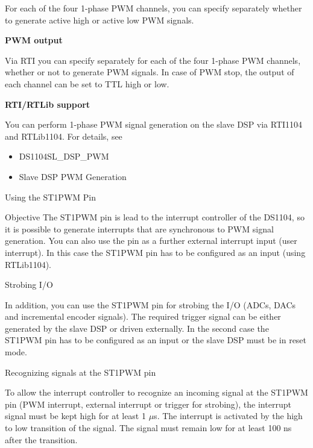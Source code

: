 For each of the four 1-phase PWM channels, you can specify separately whether to generate active high or active low PWM signals.

\noindent \textbf{PWM output}\par
Via RTI you can specify separately for each of the four 1-phase PWM channels, whether or not to generate PWM signals. In case of PWM stop, the output of each channel can be set to TTL high or low.

\noindent \textbf{RTI/RTLib support}\par
You can perform 1-phase PWM signal generation on the slave DSP via RTI1104 and RTLib1104. For details, see
\begin{itemize}
    \item DS1104SL\_DSP\_PWM
    \item Slave DSP PWM Generation
\end{itemize}

Using the ST1PWM Pin

Objective
The ST1PWM pin is lead to the interrupt controller of the DS1104, so it is possible to generate interrupts that are synchronous to PWM signal generation. You can also use the pin as a further external interrupt input (user interrupt). In this case the ST1PWM pin has to be configured as an input (using RTLib1104).

Strobing I/O

In addition, you can use the ST1PWM pin for strobing the I/O (ADCs, DACs and incremental encoder signals). The required trigger signal can be either generated by the slave DSP or driven externally. In the second case the ST1PWM pin has to be configured as an input or the slave DSP must be in reset mode.

Recognizing signals at the ST1PWM pin

To allow the interrupt controller to recognize an incoming signal at the ST1PWM pin (PWM interrupt, external interrupt or trigger for strobing), the interrupt signal must be kept high for at least 1 $\mu$s. The interrupt is activated by the high to low transition of the signal. The signal must remain low for at least 100 ns after the transition.

\newpage 






\newpage
\printbibliography[
heading=bibintoc,
title={References}
]

\newpage
\appendix






